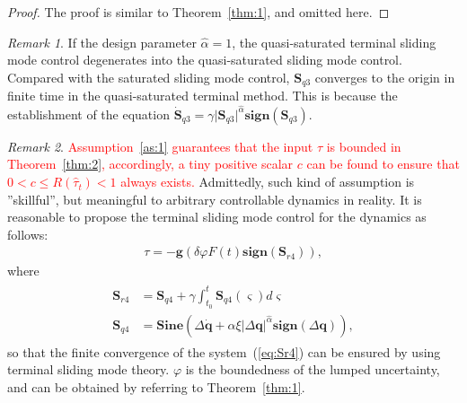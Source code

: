 \documentclass[3p]{elsarticle}
\theoremstyle{plain}
\theoremstyle{remark}
\newtheorem{myrem}{Remark}
\begin{document}
\begin{proof}
The proof is similar to Theorem~\ref{thm:1}, and omitted here.
\end{proof}
\begin{myrem}
If the design parameter $\hat\alpha = 1$, the quasi-saturated terminal sliding mode control degenerates into the quasi-saturated sliding mode control. Compared with the saturated sliding mode control, $\bm S_{q3}$ converges to the origin in finite time in the quasi-saturated terminal method. This is because the establishment of the equation $\dot {\bm S}_{q3} = \gamma\vert \bm S_{q3}\vert^{\hat\alpha} \bm{ sign}(\bm S_{q3})$.
\end{myrem}
\begin{myrem}
\textcolor{red}{Assumption~\ref{as:1} guarantees that the input $\tau$ is bounded in Theorem~\ref{thm:2}, accordingly, a tiny positive scalar $c$ can be found to ensure that $0<c\le R(\hat\tau_t)<1$ always exists.} Admittedly, such kind of assumption is ''skillful'', but meaningful to arbitrary controllable dynamics in reality. It is reasonable to propose the terminal sliding mode control for the dynamics as follows:
\begin{align}
\tau = -\bm{g}(\delta\varphi F(t) \bm{sign}(\bm S_{r4})),
\end{align}
where
\begin{align}
\begin{split}
\bm S_{r4} &= \bm S_{q4}+\gamma\int^t_{t_0}\bm S_{q4}(\varsigma) d\varsigma\\
\bm S_{q4} &= \bm{Sine}(\Delta \dot {\bm q}+\alpha\xi\vert\Delta \bm q\vert^{\hat\alpha}\bm{sign}(\Delta \bm q)),\label{eq:Sr4}
\end{split}
\end{align}
so that the finite convergence of the system~(\ref{eq:Sr4}) can be ensured by using terminal sliding mode theory. $\varphi$ is the boundedness of the lumped uncertainty, and can be obtained by referring to Theorem~\ref{thm:1}.
\end{myrem}
\end{document}
